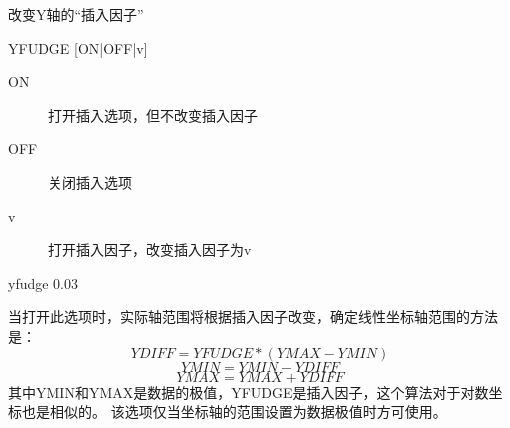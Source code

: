 \label{cmd:yfudge}

改变Y轴的``插入因子''

\begin{SACSTX}
YFUDGE [ON|OFF|v]
\end{SACSTX}

\begin{description}
\item [ON] 打开插入选项，但不改变插入因子
\item [OFF] 关闭插入选项
\item [v] 打开插入因子，改变插入因子为v
\end{description}

\begin{SACDFT}
yfudge 0.03
\end{SACDFT}

当打开此选项时，实际轴范围将根据插入因子改变，确定线性坐标轴范围的方法是：
\[ YDIFF=YFUDGE*(YMAX-YMIN) \]
\[ YMIN=YMIN-YDIFF \]
\[ YMAX=YMAX+YDIFF \]
其中YMIN和YMAX是数据的极值，YFUDGE是插入因子，这个算法对于对数坐标也是相似的。
该选项仅当坐标轴的范围设置为数据极值时方可使用。

